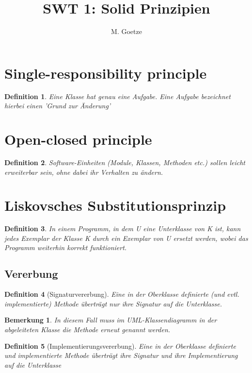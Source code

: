 \documentclass[a4paper]{article}
\title{SWT 1: Solid Prinzipien}
\author{M. Goetze}
\theoremstyle{break}
\newtheorem{defi}{Definition}[section]
\newtheorem{ann}{Bemerkung}[section]
\begin{document}
	\maketitle
	\tableofcontents
	\newpage


\section{Single-responsibility principle}
\begin{defi}
	Eine Klasse hat genau eine Aufgabe. Eine Aufgabe bezeichnet hierbei einen 'Grund zur Änderung'
\end{defi}

\section{Open-closed principle}
\begin{defi}
	Software-Einheiten (Module, Klassen, Methoden etc.) sollen leicht erweiterbar sein, ohne dabei ihr Verhalten zu ändern.
\end{defi}

\section{Liskovsches Substitutionsprinzip}
\begin{defi}
	In einem Programm, in dem U eine Unterklasse von K ist, kann jedes Exemplar der Klasse K durch ein Exemplar von U ersetzt werden, wobei das Programm weiterhin korrekt funktioniert.
\end{defi}
\subsection{Vererbung}
\begin{defi}[Signaturvererbung]
Eine in der Oberklasse definierte (und evtl. implementierte) Methode überträgt nur ihre Signatur auf die Unterklasse.
\end{defi}

\begin{ann}
	In diesem Fall muss im UML-Klassendiagramm in der abgeleiteten Klasse die Methode erneut genannt werden.
\end{ann}

\begin{defi}[Implementierungsvererbung]
	Eine in der Oberklasse definierte und implementierte Methode überträgt ihre Signatur und ihre Implementierung auf die Unterklasse 
\end{defi}
\end{document}
